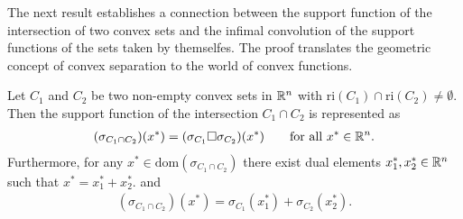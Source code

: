 The next result establishes a connection between the support function of the intersection of two convex sets and the infimal convolution of the support functions of the sets taken by themselfes.
The proof translates the geometric concept of convex separation to the world of convex functions.

\begin{ftheorem}
  Let $C_1$ and $C_2$ be two non-empty convex sets in $\mathbb{R}^n$ with
  $\mathrm{ri}(C_1)\cap\mathrm{ri}(C_2)\neq\emptyset.$
  Then the support function of the intersection 
  $
    C_1 \cap C_2
  $
  is represented as
  \begin{gather}
    (\sigma_{
    C_1 \cap C_2
    })
    (x^*)
    =
    (\sigma_{C_1}\square \sigma_{C_2})
    (x^*)
    \qquad
    \text{for all}\ 
    x^* \in \R^n.
  \end{gather}
  Furthermore, for any
  $
  x^*\in \mathrm{dom}
    (\sigma_{
    C_1 \cap C_2
    })
  $
  there exist dual elements 
  $
    x_1^*
    ,
    x_2^*
    \in \mathbb{R}^n
  $ 
  such that 
  $
    x^*
    =
    x_1^*
    +
    x_2^*.
  $
  and
  \begin{gather}
    (\sigma_{
    C_1 \cap C_2
    })
    (x^*)
    =
    \sigma_{C_1}(x_1^*)
    +
    \sigma_{C_2}(x_2^*).
  \end{gather}
\end{ftheorem}
